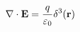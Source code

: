 \documentclass[preview]{standalone}
\begin{document}
\begin{align*}
\special{dvisvgm:raw <g id='unique000'>}\nabla\cdot\mathbf E=\frac{q}{\varepsilon_0}\delta^3(\mathbf r)\special{dvisvgm:raw </g>}
\end{align*}
\end{document}
